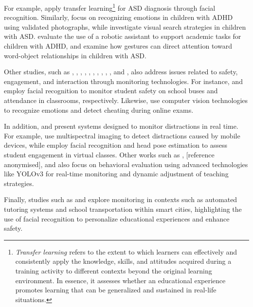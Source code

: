 			For example, \cite{Akter2021} apply transfer learning\footnote{\textit{Transfer learning \cite{Akter2021}} refers to the extent to which learners can effectively and consistently apply the knowledge, skills, and attitudes acquired during a training activity to different contexts beyond the original learning environment. In essence, it assesses whether an educational experience promotes learning that can be generalized and sustained in real-life situations.} for ASD diagnosis through facial recognition. Similarly, \cite{Pelc2006} focus on recognizing emotions in children with ADHD using validated photographs, while \cite{Albrecht2014} investigate visual search strategies in children with ASD. \cite{Berrezueta-Guzman2021} evaluate the use of a robotic assistant to support academic tasks for children with ADHD, and \cite{VilliersRader2021} examine how gestures can direct attention toward word-object relationships in children with ASD.
			
			Other studies, such as \cite{Boumiza2017}, \cite{DaCosta2023}, \cite{Enadula2021}, \cite{Farsani2020}, \cite{Hachad2020}, \cite{James2019}, \cite{Kulkarni2023}, \cite{Kumar2024Zoom}, \cite{Muller2018ArchnSmile}, \cite{Narkhede2023}, and \cite{Ozdamli2022}, also address issues related to safety, engagement, and interaction through monitoring technologies. For instance, \cite{Hachad2020} and \cite{James2019} employ facial recognition to monitor student safety on school buses and attendance in classrooms, respectively. Likewise, \cite{Ozdamli2022} use computer vision technologies to recognize emotions and detect cheating during online exams.
			
			In addition, \cite{Campbell2015Using} and \cite{Ucar2022Recognizing} present systems designed to monitor distractions in real time. For example, \cite{Campbell2015Using} use multispectral imaging to detect distractions caused by mobile devices, while \cite{Ucar2022Recognizing} employ facial recognition and head pose estimation to assess student engagement in virtual classes. Other works such as \cite{Argel2023Intellitell}, [reference anonymised], and \cite{Nguyen2019} also focus on behavioral evaluation using advanced technologies like YOLOv3 for real-time monitoring and dynamic adjustment of teaching strategies.
			
			Finally, studies such as \cite{Boumiza2017} and \cite{DaCosta2023} explore monitoring in contexts such as automated tutoring systems and school transportation within smart cities, highlighting the use of facial recognition to personalize educational experiences and enhance safety.
			
